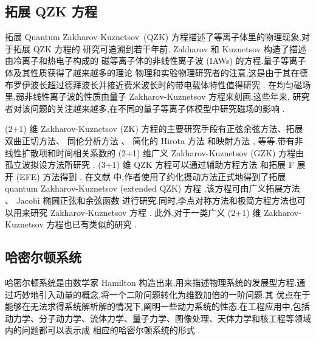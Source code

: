 \subsection{拓展 QZK 方程}

拓展 Quantum Zakharov-Kuznetsov~(QZK) 方程描述了等离子体里的物理现象,对于拓展 QZK 方程的
研究可追溯到若干年前. Zakharov 和 Kuznetsov \cite{abdou2011quant} 构造了描述由冷离子和热电子构成的
磁等离子体的非线性离子波 (IAWs) 的方程.量子等离子体及其性质获得了越来越多的理论
物理和实验物理研究者的注意,这是由于其在德布罗伊波长超过德拜波长并接近费米波长时的带电载体特性值得研究 \cite{abdou2011quant,ahmed2013kinks,bhrawy2013soli,biswas20091soli,biswas2013soli,bluman2010appli,elganaini2011tra,godleswski2004the,guner2015bright,ibragimov2006inte}. 在均匀磁场里,弱非线性离子波的性质由量子 Zakharov-Kuznetsov 方程来刻画.这些年来,
研究者对该问题的关注越来越多,在不同的量子等离子体模型中研究磁场的影响 \cite{ibragimov2007anew,iwasaki1990cylin,johnpilai2011sym,khan2008linear,krishnan2010sol,leveque1992num,linares2009well,linares2011local,morris2013soli,moslem2007soli,mothibi2015con,moussa2001simi,munro2014con,munro2000sta,mushtaq2005non,olver2000app,peng2008exact,sabry2009non}.

(2+1) 维 Zakharov-Kuznetsov (ZK) 方程的主要研究手段有正弦余弦方法、拓展双曲正切方法、
同伦分析方法 \cite{linares2009well}、 简化的 Hirota 方法 \cite{biswas2013soli,bluman2010appli}
和映射方法 \cite{morris2013soli}, 等等.带有非线性扩散项和时间相关系数的 (2+1) 维广义
Zakharov-Kuznetsov (GZK) 方程由孤立波拟设方法所研究 \cite{sabry2009non}. (3+1) 维 QZK
方程可以通过辅助方程方法 \cite{ahmed2013kinks} 和拓展 F 展开 (EFE) 方法得到 \cite{munro2000sta}.
在文献 \cite{ahmed2013kinks} 中,作者使用了约化摄动方法正式地得到了拓展 quantum Zakharov-Kuznetsov (extended QZK) 方程
,该方程可由广义拓展方法 \cite{guner2015bright}、 Jacobi 椭圆正弦和余弦函数 \cite{biswas20091soli}
进行研究.同时,李点对称方法和极简方程方法也可以用来研究 Zakharov-Kuznetsov 方程 \cite{leveque1992num}.
此外,对于一类广义 (2+1) 维 Zakharov-Kuznetsov 方程也已有类似的研究 \cite{moslem2007soli}.

\subsection{哈密尔顿系统}

哈密尔顿系统是由数学家 Hamilton 构造出来,用来描述物理系统的发展型方程.通过巧妙地引入动量的概念,将一个二阶问题转化为维数加倍的一阶问题.其
优点在于能够在无法求得系统解析解的情况下,阐明一些动力系统的性态.在工程应用中,包括
动力学、分子动力学、流体力学、量子力学、图像处理、天体力学和核工程等领域内的问题都可以表示成
相应的哈密尔顿系统的形式 \cite{arieh2009afirst}.

